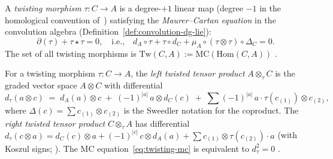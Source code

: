 \begin{definition}
\label{def:twisting-morphism}
A \emph{twisting morphism} $\tau\colon C \to A$ is a
degree-$+1$ linear map (degree $-1$ in the homological convention
of~\cite{LV12}) satisfying the \emph{Maurer--Cartan equation} in
the convolution algebra
(Definition~\ref{def:convolution-dg-lie}):
\begin{equation}\label{eq:twisting-mc}
\partial(\tau) + \tau \star \tau = 0,
\quad\text{i.e.,}\quad
d_A \circ \tau + \tau \circ d_C
+ \mu_A \circ (\tau \otimes \tau) \circ \Delta_C = 0.
\end{equation}
The set of all twisting morphisms is
$\mathrm{Tw}(C, A) := \mathrm{MC}(\mathrm{Hom}(C, A))$
\cite[\S2.1]{LV12}.
\end{definition}

\begin{definition}
\label{def:twisted-tensor-product}
For a twisting morphism $\tau\colon C \to A$, the
\emph{left twisted tensor product} $A \otimes_\tau C$ is the
graded vector space $A \otimes C$ with differential
\begin{equation}\label{eq:twisted-differential}
d_\tau(a \otimes c)
\;=\;
d_A(a) \otimes c
\;+\; (-1)^{|a|}\, a \otimes d_C(c)
\;+\; \sum (-1)^{|a|}\, a \cdot \tau(c_{(1)}) \otimes c_{(2)},
\end{equation}
where $\Delta(c) = \sum c_{(1)} \otimes c_{(2)}$ is the Sweedler
notation for the coproduct. The \emph{right twisted tensor product}
$C \otimes_\tau A$ has differential
$d_\tau(c \otimes a) = d_C(c) \otimes a + (-1)^{|c|}\,
c \otimes d_A(a) + \sum c_{(1)} \otimes \tau(c_{(2)}) \cdot a$
(with Koszul signs; \cite[2.1.5]{LV12}). The MC
equation~\eqref{eq:twisting-mc} is equivalent to
$d_\tau^2 = 0$ \cite[Lemma~2.1.4]{LV12}.
\end{definition}

